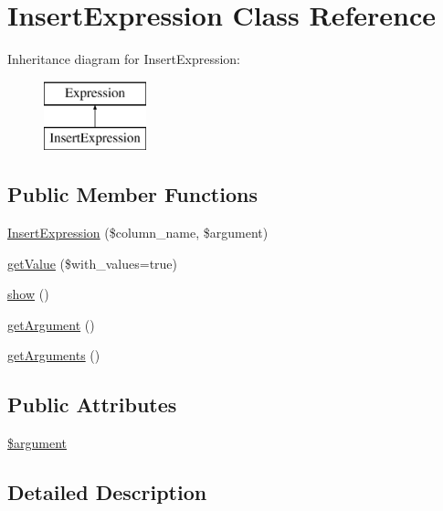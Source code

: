 \hypertarget{classInsertExpression}{\section{Insert\+Expression Class Reference}
\label{classInsertExpression}
}
Inheritance diagram for Insert\+Expression\+:\begin{figure}[H]
\begin{center}
\leavevmode
\includegraphics[height=2.000000cm]{classInsertExpression}
\end{center}
\end{figure}
\subsection*{Public Member Functions}
\begin{DoxyCompactItemize}
\item 
\hyperlink{classInsertExpression_af74e1c580c2f1691cdd1bc22c221bc8f}{Insert\+Expression} (\$column\+\_\+name, \$argument)
\item 
\hyperlink{classInsertExpression_ad9d21fa7983a8d93730c6d16b24a0c32}{get\+Value} (\$with\+\_\+values=true)
\item 
\hyperlink{classInsertExpression_a31b4e3976aeb6d73a8f8dba3cd055c29}{show} ()
\item 
\hyperlink{classInsertExpression_aa0f93cc5194b4605d63f96b53f3d037d}{get\+Argument} ()
\item 
\hyperlink{classInsertExpression_aa18be08ea777a25c8f06505d8710ced2}{get\+Arguments} ()
\end{DoxyCompactItemize}
\subsection*{Public Attributes}
\begin{DoxyCompactItemize}
\item 
\hyperlink{classInsertExpression_a0a8efa361a069392a3cca64a675023e0}{\$argument}
\end{DoxyCompactItemize}


\subsection{Detailed Description}


